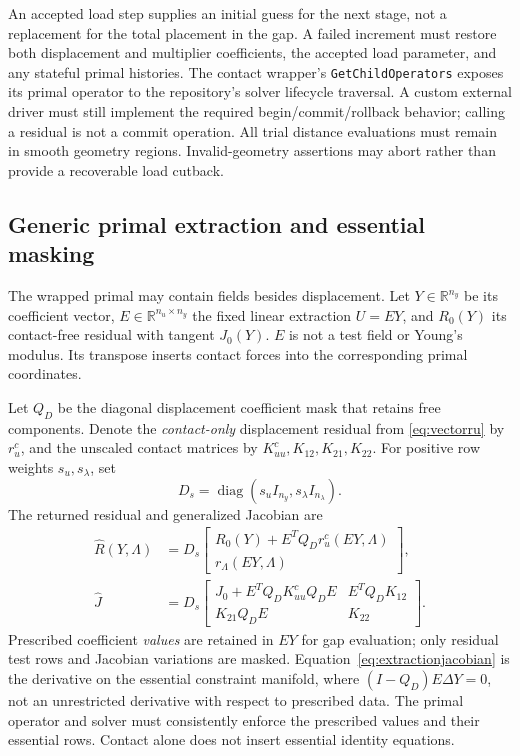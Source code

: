\documentclass[preprint,11pt]{elsarticle}
\numberwithin{equation}{section}
\newcommand{\code}[1]{\texttt{\nolinkurl{#1}}}
\begin{document}
An accepted load step supplies an initial guess for the next stage, not
a replacement for the total placement in the gap. A failed increment
must restore both displacement and multiplier coefficients, the accepted
load parameter, and any stateful primal histories. The contact wrapper's
\code{GetChildOperators} exposes its primal operator to the repository's
solver lifecycle traversal. A custom external driver must still implement
the required begin/commit/rollback behavior; calling a residual is not a
commit operation. All trial distance evaluations must remain in smooth
geometry regions. Invalid-geometry assertions may abort rather than
provide a recoverable load cutback.

\subsection{Generic primal extraction and essential masking}
The wrapped primal may contain fields besides displacement. Let
$Y\in\mathbb R^{n_y}$ be its coefficient vector,
$E\in\mathbb R^{n_u\times n_y}$ the fixed linear extraction $U=EY$,
and $R_0(Y)$ its contact-free residual with tangent $J_0(Y)$.
$E$ is not a test field or Young's modulus. Its transpose inserts contact
forces into the corresponding primal coordinates.

Let $Q_D$ be the diagonal displacement coefficient mask that retains
free components. Denote the \emph{contact-only} displacement residual
from \eqref{eq:vectorru} by $r_u^c$, and the unscaled contact matrices
by $K_{uu}^c,K_{12},K_{21},K_{22}$. For positive row weights
$s_u,s_\lambda$, set
\begin{equation}
 D_s=\operatorname{diag}(s_u I_{n_y},s_\lambda I_{n_\lambda}).
 \label{eq:rowscaling}
\end{equation}
The returned residual and generalized Jacobian are
\begin{align}
 \widehat R(Y,\Lambda)
 &=D_s\begin{bmatrix}
       R_0(Y)+E^TQ_Dr_u^c(EY,\Lambda)\\
       r_\Lambda(EY,\Lambda)
       \end{bmatrix},\label{eq:extractionresidual}\\
 \widehat J
 &=D_s\begin{bmatrix}
       J_0+E^TQ_DK_{uu}^cQ_DE&E^TQ_DK_{12}\\
       K_{21}Q_DE&K_{22}
       \end{bmatrix}.
 \label{eq:extractionjacobian}
\end{align}
Prescribed coefficient \emph{values} are retained in $EY$ for gap
evaluation; only residual test rows and Jacobian variations are masked.
Equation~\eqref{eq:extractionjacobian} is the derivative on the essential
constraint manifold, where $(I-Q_D)E\Delta Y=0$, not an unrestricted
derivative with respect to prescribed data. The primal operator and solver
must consistently enforce the prescribed values and their essential
rows. Contact alone does not insert essential identity equations.
\end{document}
